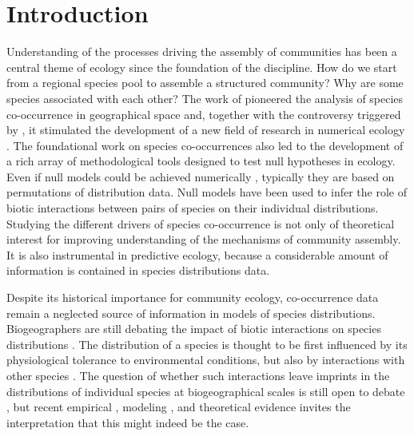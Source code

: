 \section{Introduction}
\label{intro}

Understanding of the processes driving the assembly of communities has been a central theme of ecology since the foundation of the discipline. How do we start from a regional species pool to assemble a structured community? Why are some species associated with each other? The work of \cite{Diamond1975} pioneered the analysis of species co-occurrence in geographical space and, together with the controversy triggered by
\cite{Connor1979}, it stimulated the development of a new field of
research in numerical ecology \citep{Stone1990, Gotelli1996,
legendre2012numerical}.
The foundational work on species co-occurrences also led to the development of a rich array of methodological tools designed to test null hypotheses in ecology. Even if null models could be achieved numerically \citep[\textit{e.g.},][]{Araujo2011}, typically they are based on permutations of distribution data.
Null models have been used to infer the role of biotic interactions between pairs of species on their individual distributions. Studying the different drivers of species co-occurrence is not only of theoretical interest for improving understanding of the mechanisms of community assembly. It is also instrumental in predictive ecology, because a considerable amount of information is contained in species distributions data.

Despite its historical importance for community ecology, co-occurrence data remain a neglected source of information in models of species distributions.
Biogeographers are still debating the impact of biotic interactions on species distributions \citep{Guisan2005, Gotelli2010,
Kissling2012, Pellissier2013}.
The distribution of a species
is thought to be first influenced by its physiological tolerance to
environmental conditions, but also by interactions with other species
\citep{Hutchinson1957, macarthur1972geographical,
Peterson2011, Boulangeat2012}.
The question of whether such
interactions leave imprints in the distributions of individual species at
biogeographical scales is still open to debate \citep[\textit{e.g.}][]{Davis1998}, but recent empirical
\cite{Gotelli2010}, modeling
\citep[\textit{e.g.}][]{Araujo2007}, and theoretical \citep{Araujo2011}
evidence invites the interpretation that this might indeed be the case.

